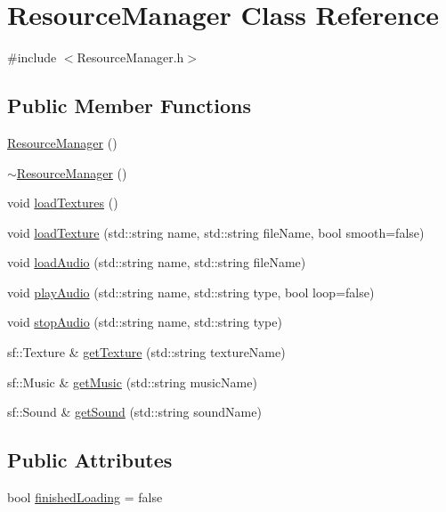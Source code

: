 \hypertarget{class_resource_manager}{}\section{Resource\+Manager Class Reference}
\label{class_resource_manager}


{\ttfamily \#include $<$Resource\+Manager.\+h$>$}

\subsection*{Public Member Functions}
\begin{DoxyCompactItemize}
\item 
\mbox{\hyperlink{class_resource_manager_a3b32babd2e81909bbd90d7f2d566fadb}{Resource\+Manager}} ()
\item 
\mbox{\hyperlink{class_resource_manager_a671c186e4630599e7e36d000c53eaf80}{$\sim$\+Resource\+Manager}} ()
\item 
void \mbox{\hyperlink{class_resource_manager_a919e53911b0b9609d74a40403e89edb2}{load\+Textures}} ()
\item 
void \mbox{\hyperlink{class_resource_manager_a31e9d2aeda022c4cfd5282a0f3dbce68}{load\+Texture}} (std\+::string name, std\+::string file\+Name, bool smooth=false)
\item 
void \mbox{\hyperlink{class_resource_manager_a44a1cbc17989de53902b433e15c05b7f}{load\+Audio}} (std\+::string name, std\+::string file\+Name)
\item 
void \mbox{\hyperlink{class_resource_manager_aea954ee26cf7b874b32fcdcf4500d028}{play\+Audio}} (std\+::string name, std\+::string type, bool loop=false)
\item 
void \mbox{\hyperlink{class_resource_manager_ae9e9bbbf00d4644f60d88da0b122e279}{stop\+Audio}} (std\+::string name, std\+::string type)
\item 
sf\+::\+Texture \& \mbox{\hyperlink{class_resource_manager_abf59408987dd1e9a52bfbd917ad5fa80}{get\+Texture}} (std\+::string texture\+Name)
\item 
sf\+::\+Music \& \mbox{\hyperlink{class_resource_manager_a950ecbe357ba67d190c261b686fe72b2}{get\+Music}} (std\+::string music\+Name)
\item 
sf\+::\+Sound \& \mbox{\hyperlink{class_resource_manager_a329396127d82cab5247d91eefa2e5c8d}{get\+Sound}} (std\+::string sound\+Name)
\end{DoxyCompactItemize}
\subsection*{Public Attributes}
\begin{DoxyCompactItemize}
\item 
bool \mbox{\hyperlink{class_resource_manager_a6e46ce9f52aa0a19bfd9ee21aa259e8d}{finished\+Loading}} = false
\end{DoxyCompactItemize}


